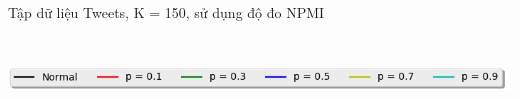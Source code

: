 \documentclass[pdf]{beamer}
\begin{document}
\begin{frame}{Tập dữ liệu Tweets, K = 150, sử dụng độ đo NPMI }
\begin{columns}[T] %
\begin{column}{.50\textwidth}
\begin{figure}
\end{figure}
\end{column} %
\hfill%
\begin{column}{.50\textwidth}
\begin{figure}
\end{figure}				
\end{column} %
\end{columns}
\begin{center}
\includegraphics[width=1\textwidth]{menu.png}	
\end{center}
\end{frame}
\end{document}
